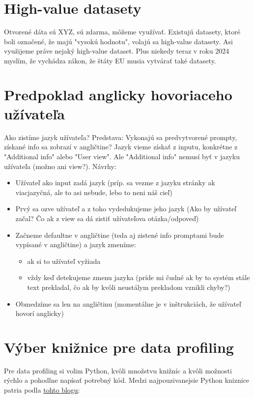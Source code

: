 \section{High-value datasety}

Otvorené dáta sú XYZ, sú zdarma, môžeme využívať. Existujú datasety, ktoré boli označené, že majú "vysokú hodnotu", volajú sa high-value datasety. Asi využijeme práve nejaký high-value dataset. Plus niekedy teraz v roku 2024 myslím, že vychádza zákon, že štáty EU musia vytvárať také datasety.

\section{Predpoklad anglicky hovoriaceho užívateľa}

Ako zistíme jazyk užívateľa? Predstava: Vykonajú sa predvytvorené prompty, získané info sa zobrazí v angličtine? Jazyk vieme získať z inputu, konkrétne z "Additional info" alebo "User view". Ale "Additional info" nemusí byť v jazyku užívateľa (možno ani view?). Návrhy:
\begin{itemize}
\item Užívateľ ako input zadá jazyk (príp. sa vezme z jazyku stránky ak viacjazyčná, ale to asi nebude, lebo to neni náš cieľ)
\item Prvý sa ozve užívateľ a z toho vydedukujeme jeho jazyk (Ako by užívateľ začal? Čo ak z view sa dá zistiť užívateľova otázka/odpoveď)
\item Začneme defaultne v angličtine (teda aj zistené info promptami bude vypísané v angličtine) a jazyk zmeníme:
\begin{itemize}
\item ak si to užívateľ vyžiada
\item vždy keď detekujeme zmenu jazyka (príde mi čudné ak by to systém stále text prekladal, čo ak by kvôli neustálym prekladom vznikli chyby?)
\end{itemize}
\item Obmedzíme sa len na angličtinu (momentálne je v inštrukciách, že užívateľ hovorí anglicky)
\end{itemize}

\section{Výber knižnice pre data profiling}

Pre data profiling si volim Python, kvôli množstvu knižníc a kvôli možnosti rýchlo a pohodlne napísať potrebný kód. Medzi najpouzivanejsie Python kniznice patria podla \href{https://medium.com/@seckindinc/data-profiling-with-python-36497d3a1261}{tohto blogu}:

